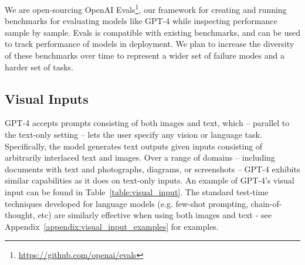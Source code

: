 \documentclass{article}
\begin{document}
We are open-sourcing OpenAI Evals\footnote{\href{https://github.com/openai/evals}{https://github.com/openai/evals}}, our framework for creating and running benchmarks for evaluating models like GPT-4 while inspecting performance sample by sample. Evals is compatible with existing benchmarks, and can be used to track performance of models in deployment. We plan to increase the diversity of these benchmarks over time to represent a wider set of failure modes and a harder set of tasks.


\subsection{Visual Inputs}




GPT-4 accepts prompts consisting of both images and text, which -- parallel to the text-only setting -- lets the user specify any vision or language task.
Specifically, the model generates text outputs given inputs consisting of arbitrarily
interlaced text and images.
Over a range of domains -- including documents with text and photographs, diagrams, or screenshots -- GPT-4 exhibits similar capabilities as it does on text-only inputs. An example of GPT-4's visual input can be found in Table~\ref{table:visual_input}. The standard test-time techniques developed for language models (e.g. few-shot prompting, chain-of-thought, etc) are similarly effective when using both images and text - see Appendix~\ref{appendix:visual_input_examples} for examples.
\end{document}
